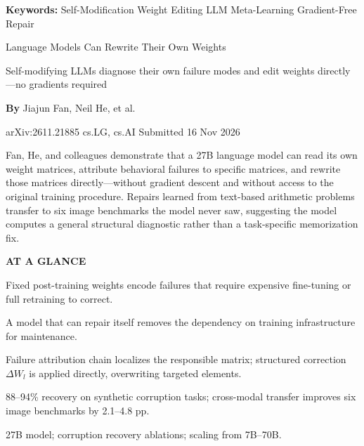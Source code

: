 \documentclass[10pt,twocolumn]{article}
\begin{document}
\setlength{\parindent}{0pt}
\setlength{\parskip}{4pt}

{\small\color{keywordgray}\textbf{Keywords:}
  Self-Modification \textbullet{} Weight Editing \textbullet{} LLM \textbullet{} Meta-Learning \textbullet{} Gradient-Free Repair}\par\vspace{4pt}

{\LARGE\bfseries\raggedright Language Models Can Rewrite Their Own Weights}\par\vspace{4pt}
{\large\itshape\raggedright Self-modifying LLMs diagnose their own failure modes and edit weights directly---no gradients required}\par\vspace{6pt}
{\small\textbf{By} Jiajun Fan, Neil He, et al.}\par\vspace{2pt}
{\small\color{keywordgray}arXiv:2611.21885 \textbullet{} cs.LG, cs.AI \textbullet{} Submitted 16 Nov 2026}
\par\vspace{2pt}\noindent{\color{rulered}\rule{\columnwidth}{0.6pt}}\vspace{6pt}

Fan, He, and colleagues demonstrate that a 27B language model can read its own weight matrices, attribute behavioral failures to specific matrices, and rewrite those matrices directly---without gradient descent and without access to the original training procedure.
Repairs learned from text-based arithmetic problems transfer to six image benchmarks the model never saw, suggesting the model computes a general structural diagnostic rather than a task-specific memorization fix.

\begin{mdframed}[backgroundcolor=boxgray,linecolor=rulered,linewidth=1pt,
    innerleftmargin=6pt,innerrightmargin=6pt,
    innertopmargin=6pt,innerbottommargin=6pt]
\textbf{\small AT A GLANCE}\par\vspace{4pt}
\begin{description}[leftmargin=0pt,labelsep=4pt,itemsep=2pt,parsep=0pt,
    font=\small\bfseries]
  \item[Problem:] Fixed post-training weights encode failures that require expensive fine-tuning or full retraining to correct.
  \item[Why it matters:] A model that can repair itself removes the dependency on training infrastructure for maintenance.
  \item[Method:] Failure attribution chain localizes the responsible matrix; structured correction $\Delta W_l$ is applied directly, overwriting targeted elements.
  \item[Result:] 88--94\% recovery on synthetic corruption tasks; cross-modal transfer improves six image benchmarks by 2.1--4.8 pp.
  \item[Evidence:] 27B model; corruption recovery ablations; scaling from 7B--70B.
\end{description}
\end{mdframed}
\end{document}

